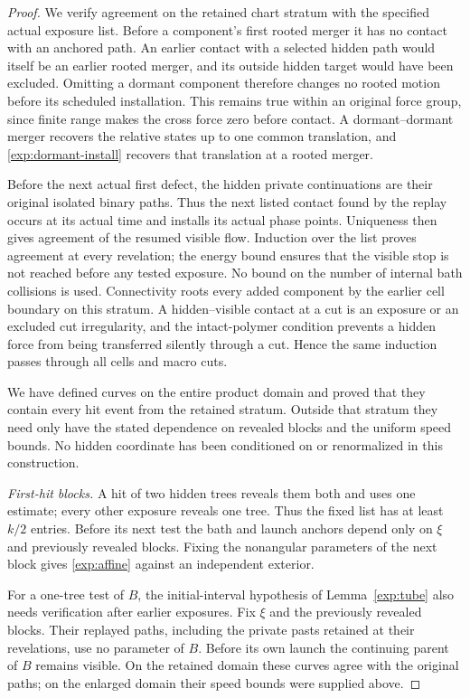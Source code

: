 \begin{proof}
We verify agreement on the retained chart stratum with the specified
actual exposure list.  Before a component's first rooted merger it has
no contact with an anchored path.  An earlier contact with a selected
hidden path would itself be an earlier rooted merger, and its outside
hidden target would have been excluded.  Omitting a dormant component
therefore changes no rooted motion before its scheduled installation.
This remains true within an original force group, since finite range
makes the cross force zero before contact.  A dormant--dormant merger
recovers the relative states up to one common translation, and
\eqref{exp:dormant-install} recovers that translation at a rooted merger.

Before the next actual first defect, the hidden private continuations
are their original isolated binary paths.  Thus the next listed contact
found by the replay occurs at its actual time and installs its actual
phase points.  Uniqueness then gives agreement of the resumed visible
flow.  Induction over the list proves agreement at every revelation;
the energy bound ensures that the visible stop is not reached before
any tested exposure.  No bound on the number of internal bath collisions
is used.  Connectivity roots every added component by the earlier cell
boundary on this stratum.  A hidden--visible contact at a cut is an exposure
or an excluded cut irregularity, and the intact-polymer condition prevents
a hidden force from being transferred silently through a cut.  Hence the
same induction passes through all cells and macro cuts.

We have defined curves on the entire product domain and proved that they
contain every hit event from the retained stratum.  Outside that stratum
they need only have the stated dependence on revealed blocks and the
uniform speed bounds.  No hidden coordinate has been conditioned on or
renormalized in this construction.

\emph{First-hit blocks.}
A hit of two hidden trees reveals them both and uses one estimate;
every other exposure reveals one tree.  Thus the fixed list has at least
$k/2$ entries.  Before its next test the bath and launch anchors depend
only on $\xi$ and previously revealed blocks.  Fixing the nonangular
parameters of the next block gives \eqref{exp:affine} against an
independent exterior.

For a one-tree test of $B$, the initial-interval hypothesis of
Lemma~\ref{exp:tube} also needs verification after earlier exposures.
Fix $\xi$ and the previously revealed blocks.  Their replayed paths,
including the private pasts retained at their revelations, use no parameter
of $B$.  Before its own launch the continuing parent of $B$ remains
visible.  On the retained domain these curves agree with the original
paths; on the enlarged domain their speed bounds were supplied above.


\end{proof}
